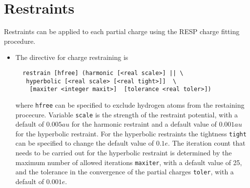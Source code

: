 \section{Restraints}
Restraints can be applied to each partial charge using the RESP charge
fitting procedure.
\begin{itemize}
\item
The directive for charge restraining is
\begin{verbatim}
  restrain [hfree] (harmonic [<real scale>] || \
   hyperbolic [<real scale> [<real tight>]]  \
    [maxiter <integer maxit>]  [tolerance <real toler>])
\end{verbatim}
where \verb+hfree+ can be specified to exclude hydrogen atoms from the
restaining procecure. Variable \verb+scale+ is the strength of the 
restraint potential, with a default of $0.005 au$ for the harmonic
restraint and a default value of $0.001 au$ for the hyperbolic restraint.
For the hyperbolic restraints the tightness \verb+tight+ can be specified
to change the default value of $0.1 e$. The iteration count that needs to
be carried out for the hyperbolic restraint is determined by the
maximum number of allowed iterations \verb+maxiter+, with a default value
of 25, and the tolerance in the convergence of the partial charges
\verb+toler+, with a default of $0.001 e$.
\end{itemize}
